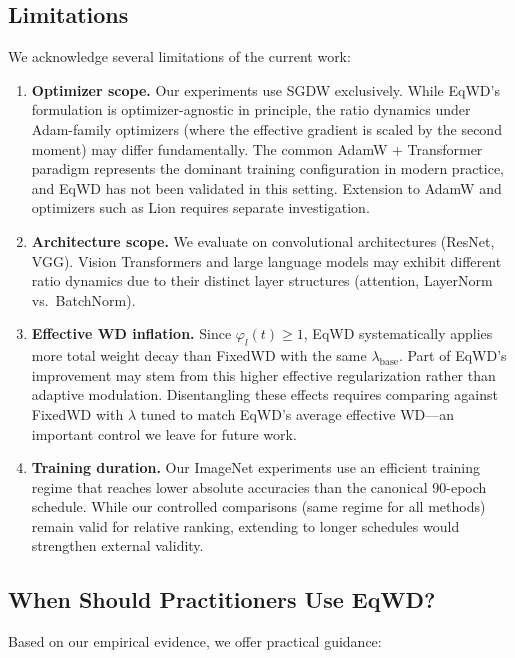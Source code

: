 \documentclass{article}
\begin{document}
\subsection{Limitations}
\label{sec:limitations}

We acknowledge several limitations of the current work:

\begin{enumerate}
\item
  \textbf{Optimizer scope.} Our experiments use SGDW exclusively. While
  EqWD's formulation is optimizer-agnostic in principle, the ratio
  dynamics under Adam-family optimizers (where the effective gradient is
  scaled by the second moment) may differ fundamentally. The common
  AdamW + Transformer paradigm
  \citep{loshchilov2019adamw, dosovitskiy2021vit} represents the dominant
  training configuration in modern practice, and EqWD has not been
  validated in this setting. Extension to AdamW and optimizers such as
  Lion \citep{chen2023lion} requires separate investigation.
\item
  \textbf{Architecture scope.} We evaluate on convolutional
  architectures (ResNet, VGG). Vision Transformers and large language
  models may exhibit different ratio dynamics due to their distinct
  layer structures (attention, LayerNorm vs.~BatchNorm).
\item
  \textbf{Effective WD inflation.} Since $\varphi_l(t) \geq 1$,
  EqWD systematically applies more total weight decay than FixedWD with
  the same $\lambda_{\text{base}}$. Part of EqWD's improvement may stem
  from this higher effective regularization rather than adaptive modulation.
  Disentangling these effects requires comparing against FixedWD with
  $\lambda$ tuned to match EqWD's average effective WD---an important
  control we leave for future work.
\item
  \textbf{Training duration.} Our ImageNet experiments use an efficient
  training regime that reaches lower absolute accuracies than the canonical
  90-epoch schedule. While our controlled comparisons (same regime for all methods)
  remain valid for relative ranking, extending to longer schedules would
  strengthen external validity.
\end{enumerate}

\subsection{When Should Practitioners Use EqWD?}
\label{sec:practitioners}

Based on our empirical evidence, we offer practical guidance:
\end{document}
